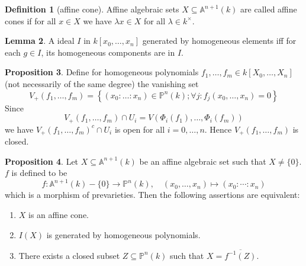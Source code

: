 \documentclass[12pt,a4paper]{book}
\newenvironment{enu}{\begin{enumerate}[(1)]}{\end{enumerate}}
\theoremstyle{definition}
\newtheorem{defn}{Definition}[section]
\newtheorem{lem}[defn]{Lemma}
\newtheorem{prop}[defn]{Proposition}
\begin{document}
\begin{defn}[affine cone]
    Affine algebraic sets $X \subseteq \mathbb{A}^{n+1}(k)$ are called affine cones if for all $x \in X$ we have $\lambda x \in X$ for all $\lambda \in k^{\times}$.
\end{defn}
\begin{lem}
    A ideal $I$ in $k[x_0,\dots,x_n]$ generated by homogeneous elements iff for each $g\in I$, its 
    homogeneous components are in $I$.
\end{lem}
\begin{prop}
    Define for homogeneous polynomials $f_1, \ldots, f_m \in k\left[X_0, \ldots, X_n\right]$ (not necessarily of the same degree) the vanishing set
    $$
    V_{+}\left(f_1, \ldots, f_m\right)=\left\{\left(x_0: \ldots: x_n\right) \in \mathbb{P}^n(k) ; \forall j: f_j\left(x_0, \ldots, x_n\right)=0\right\}
    $$
    Since 
    $$
    V_{+}\left(f_1, \ldots, f_m\right) \cap U_i=V\left(\Phi_i\left(f_1\right), \ldots, \Phi_i\left(f_m\right)\right)
    $$
    we have $V_{+}\left(f_1, \ldots, f_m\right)^c\cap U_i$ is open for all $i=0,\dots,n$. Hence 
    $V_{+}\left(f_1, \ldots, f_m\right)$ is closed.
\end{prop}
\begin{prop}
    Let $X \subseteq \mathbb{A}^{n+1}(k)$ be an affine algebraic set such that $X \neq\{0\}$. $f$ is defined to be   
    $$
    f: \mathbb{A}^{n+1}(k)-\{0\} \rightarrow \mathbb{P}^n(k), \quad\left(x_0, \ldots, x_n\right) \mapsto\left(x_0: \cdots: x_n\right)
    $$
    which is a morphism of prevarieties. Then the following assertions are equivalent:
    \begin{enu} 
    \item $X$ is an affine cone.
    \item $I(X)$ is generated by homogeneous polynomials.
    \item There exists a closed subset $Z \subseteq \mathbb{P}^n(k)$ such that $X=\overline{f^{-1}(Z)}$.
    \end{enu}
\end{prop}
\end{document}
